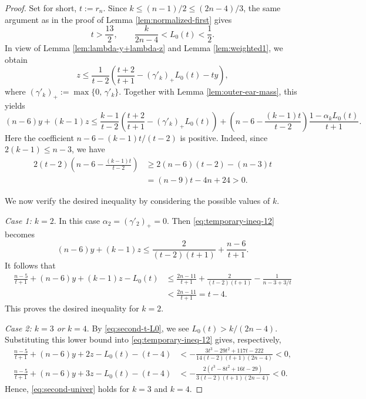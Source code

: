 \documentclass[11pt]{article}
\theoremstyle{plain}
\theoremstyle{definition}
\numberwithin{equation}{section}
\begin{document}
\begin{proof}
Set for short, $t:=r_n$. Since $k\leq (n-1)/2\leq (2n-4)/3$, the same argument as in the 
proof of Lemma \ref{lem:normalized-first} gives
\begin{equation}\label{eq:second-t-L0}
t > \frac{13}{2}, \qquad \frac{k}{2n-4} < L_0(t) < \frac{1}{2}.
\end{equation}
In view of Lemma \ref{lem:lambda-y+lambda-z} and Lemma \ref{lem:weighted1}, we obtain
\[
z\leq\frac{1}{t-2} \left(\frac{t+2}{t+1} - (\gamma'_k)_+ L_0(t) -ty\right),
\]
where $(\gamma'_k)_+:= \max\{0,\,\gamma'_k\}$.
Together with Lemma \ref{lem:outer-ear-mass}, this yields 
\begin{equation}\label{eq:temporary-ineq-12}
(n-6)y + (k-1)z\leq \frac{k-1}{t-2}
\left(\frac{t+2}{t+1} - (\gamma'_k)_+ L_0(t)\right)
+ \left(n - 6 - \frac{(k-1)t}{t-2}\right)
\frac{1-\alpha_kL_0(t)}{t+1}.
\end{equation}
Here the coefficient $n-6-(k-1)t/(t-2)$ is positive. Indeed, since $2(k-1)\leq n-3$, we have
\begin{align*}
2(t-2)\left(n-6-\frac{(k-1)t}{t-2}\right)
& \geq 2(n-6)(t-2) - (n-3)t \\
& = (n-9)t - 4n + 24 > 0.
\end{align*}

We now verify the desired inequality by considering the possible values
of $k$.
\smallskip

\noindent\emph{Case 1: $k=2$}. In this case $\alpha_2 = (\gamma'_2)_+ = 0$. Then \eqref{eq:temporary-ineq-12} becomes 
\[
(n-6)y + (k-1)z \leq \frac{2}{(t-2)(t+1)} + \frac{n-6}{t+1}.
\]
It follows that 
\begin{align*}
\frac{n-5}{t+1} + (n-6)y + (k-1)z - L_0(t) 
& \leq \frac{2n-11}{t+1} + \frac{2}{(t-2)(t+1)} - \frac{1}{n-3+3/t} \\
& < \frac{2n-11}{t+1} = t-4.
\end{align*}
This proves the desired inequality for $k=2$.
\smallskip

\noindent\emph{Case 2: $k=3$ or $k=4$}. By \eqref{eq:second-t-L0}, we see $L_0(t)>k/(2n-4)$. Substituting
this lower bound into \eqref{eq:temporary-ineq-12} gives, respectively,
\begin{align*}
\frac{n-5}{t+1}+(n-6)y+2z-L_0(t)-(t-4)
& < -\frac{3t^3-29t^2+117t-222}{14(t-2)(t+1)(2n-4)} < 0, \\
\frac{n-5}{t+1}+(n-6)y+3z-L_0(t)-(t-4)
& < -\frac{2(t^3-8t^2+16t-29)}{3(t-2)(t+1)(2n-4)} < 0.
\end{align*}
Hence, \eqref{eq:second-univer} holds for $k=3$ and $k=4$.
\smallskip


\end{proof}
\end{document}
